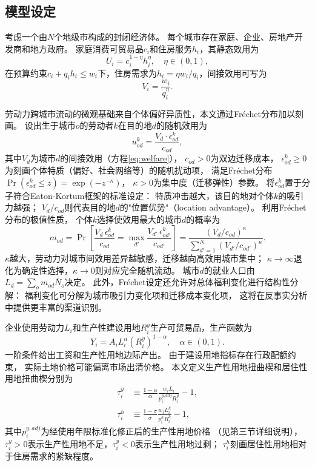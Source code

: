\documentclass[UTF8,a4paper,12pt]{ctexart}
\theoremstyle{plain}
\theoremstyle{definition}
\theoremstyle{remark}
\newcommand{\Ry}{R^{y}}
\newcommand{\Rh}{R^{h}}
\newcommand{\tauy}{\tau^{y}}
\newcommand{\tauh}{\tau^{h}}
\begin{document}
\subsection{模型设定}

考虑一个由$N$个地级市构成的封闭经济体。
每个城市存在家庭、企业、房地产开发商和地方政府。
家庭消费可贸易品$c_i$和住房服务$h_i$，其静态效用为
\begin{equation}
  U_i=c_i^{1-\eta}h_i^\eta, \quad \eta\in(0,1),
  \label{eq:utility}
\end{equation}
在预算约束$c_i+q_i h_i\leq w_i$下，住房需求为$h_i=\eta w_i/q_i$，间接效用可写为
\begin{equation}
  V_i=\frac{w_i}{q_i^\eta}.
  \label{eq:welfare}
\end{equation}

劳动力跨城市流动的微观基础来自个体偏好异质性，本文通过Fréchet分布加以刻画。
设出生于城市$o$的劳动者$k$在目的地$d$的随机效用为
\begin{equation}
  u_{od}^k = \frac{V_d \cdot \epsilon_{od}^k}{c_{od}},
  \label{eq:random_utility}
\end{equation}
其中$V_d$为城市$d$的间接效用（方程\ref{eq:welfare}），
$c_{od}>0$为双边迁移成本，
$\epsilon_{od}^k\geq 0$为刻画个体特质（偏好、社会网络等）的随机扰动项，
满足Fréchet分布$\Pr(\epsilon_{od}^k\leq z)=\exp(-z^{-\kappa})$，
$\kappa>0$为集中度（迁移弹性）参数。
将$\epsilon_{od}^k$置于分子符合Eaton-Kortum框架的标准设定：
特质冲击越大，该目的地对个体$k$的吸引力越强；
$V_d/c_{od}$则代表目的地$d$的"位置优势"（location advantage）。
利用Fréchet分布的极值性质，
个体$k$选择使效用最大的城市$d$的概率为
\begin{equation}
  m_{od}=\Pr\!\left[\frac{V_d\,\epsilon_{od}^k}{c_{od}}
    =\max_{d'}\frac{V_{d'}\,\epsilon_{od'}^k}{c_{od'}}\right]
  =\frac{(V_d/c_{od})^\kappa}{\sum_{d'=1}^N(V_{d'}/c_{od'})^\kappa}.
  \label{eq:migration}
\end{equation}
$\kappa$越大，劳动力对城市间效用差异越敏感，迁移越向高效用城市集中；
$\kappa\to\infty$退化为确定性选择，$\kappa\to 0$则对应完全随机流动。
城市$d$的就业人口由$L_d=\sum_o m_{od}\bar{N}_o$决定。
此外，Fréchet设定还允许对总体福利变化进行结构性分解：
福利变化可分解为城市吸引力变化项和迁移成本变化项，
这将在反事实分析中提供更丰富的渠道识别。

企业使用劳动力$L_i$和生产性建设用地$\Ry_i$生产可贸易品，生产函数为
\begin{equation}
  Y_i=A_i L_i^\alpha(\Ry_i)^{1-\alpha},\quad \alpha\in(0,1).
  \label{eq:production}
\end{equation}
一阶条件给出工资和生产性用地边际产出。
由于建设用地指标存在行政配额约束，
实际土地价格可能偏离市场出清价格。
本文定义生产性用地扭曲楔和居住性用地扭曲楔分别为
\begin{align}
  \tauy_i &\equiv \frac{1-\alpha}{\alpha}\frac{w_iL_i}{p_i^{y,adj}\Ry_i}-1,
  \label{eq:wedge_ry}\\
  \tauh_i &\equiv \frac{1-\sigma}{\sigma}\frac{w_iL_i^h}{p_i^h\Rh_i}-1,
  \label{eq:wedge_rh}
\end{align}
其中$p_i^{y,adj}$为经使用年限标准化修正后的生产性用地价格
（见第三节详细说明），
$\tauy_i>0$表示生产性用地不足，$\tauy_i<0$表示生产性用地过剩；
$\tauh_i$刻画居住性用地相对于住房需求的紧缺程度。
\end{document}

